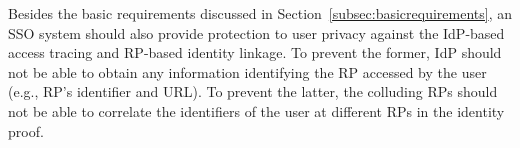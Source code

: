Besides the basic requirements discussed in Section~\ref{subsec:basicrequirements}, an SSO system should also provide protection to user privacy against the IdP-based access tracing and RP-based identity linkage. To prevent the former,  IdP should not be able to obtain any information identifying the RP accessed by the user (e.g., RP's identifier and URL). To prevent the latter, the colluding RPs should not be able to correlate the identifiers of the user at different RPs in the identity proof.


